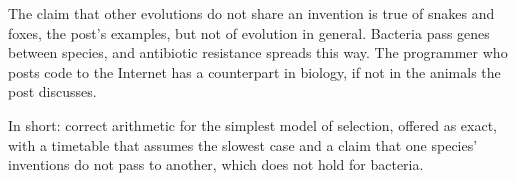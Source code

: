 \begin{afterword}
The claim that other evolutions do not share an invention is true of snakes and foxes, the post's examples, but not of evolution in general. Bacteria pass genes between species, and antibiotic resistance spreads this way. The programmer who posts code to the Internet has a counterpart in biology, if not in the animals the post discusses.

In short: correct arithmetic for the simplest model of selection, offered as exact, with a timetable that assumes the slowest case and a claim that one species' inventions do not pass to another, which does not hold for bacteria.
\end{afterword}
